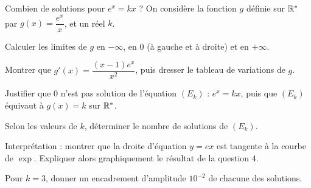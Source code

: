 \begin{exercice}[3]{Combien de solutions pour $e^{x}=kx$ ?}
On considère la fonction $g$ définie sur $\mathbb{R}^{*}$ par $g(x)=\dfrac{e^{x}}{x}$, et un réel $k$.
\begin{questions}
  \item Calculer les limites de $g$ en $-\infty$, en $0$ (à gauche et à droite) et en $+\infty$.
  \item Montrer que $g'(x)=\dfrac{(x-1)e^{x}}{x^{2}}$, puis dresser le tableau de variations de $g$.
  \item Justifier que $0$ n'est pas solution de l'équation $(E_k)$ : $e^{x}=kx$, puis que $(E_k)$ équivaut à $g(x)=k$ sur $\mathbb{R}^{*}$.
  \item Selon les valeurs de $k$, déterminer le nombre de solutions de $(E_k)$.
  \item Interprétation : montrer que la droite d'équation $y=ex$ est tangente à la courbe de $\exp$. Expliquer alors graphiquement le résultat de la question 4.
  \item Pour $k=3$, donner un encadrement d'amplitude $10^{-2}$ de chacune des solutions.
\end{questions}
\end{exercice}
